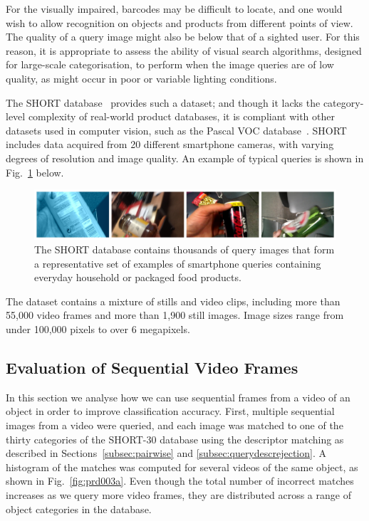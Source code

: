 For the visually impaired, barcodes may be difficult to locate, and one would wish to allow recognition on objects and products from different points of view. The quality of a query image might also be below that of a sighted user.  For this reason, it is appropriate to assess the ability of visual search algorithms, designed for large-scale categorisation, to perform when the image queries are of low quality, as might occur in poor or variable lighting conditions.

The SHORT database~\cite{Rivera-Rubio2013a} provides such a dataset; and though it lacks the category-level complexity of real-world product databases, it is compliant with other datasets used in computer vision, such as the Pascal VOC database~\cite{Everingham2009}.  SHORT includes data acquired from 20 different smartphone cameras, with varying degrees of resolution and image quality.  An example of typical queries is shown in Fig.~\ref{fig:ShortQueries} below.

\begin{figure}
\centering
\includegraphics[width=\textwidth]{./gfx/Chapter02/TestDatasetCollage4imgs.jpg}
\caption{The SHORT database contains thousands of query images that form a representative set of examples of smartphone queries containing everyday household or packaged food products.}
\label{fig:ShortQueries}
\end{figure}
The dataset contains a mixture of stills and video clips, including more than 55,000 video frames and more than 1,900 still images.  Image sizes range from under 100,000 pixels to over 6 megapixels.


\subsection{Evaluation of Sequential Video Frames} \label{subsec:evaluationframes}

In this section we analyse how we can use sequential frames from a video of an object in order to improve classification accuracy. First, multiple sequential images from a video were queried, and each image was matched to one of the thirty categories of the SHORT-30 database using the descriptor matching as described in Sections~\ref{subsec:pairwise} and \ref{subsec:querydescrejection}. A histogram of the matches was computed for several videos of the same object, as shown in Fig.~\ref{fig:prd003a}. Even though the total number of incorrect matches increases as we query more video frames, they are distributed across a range of object categories in the database. 

